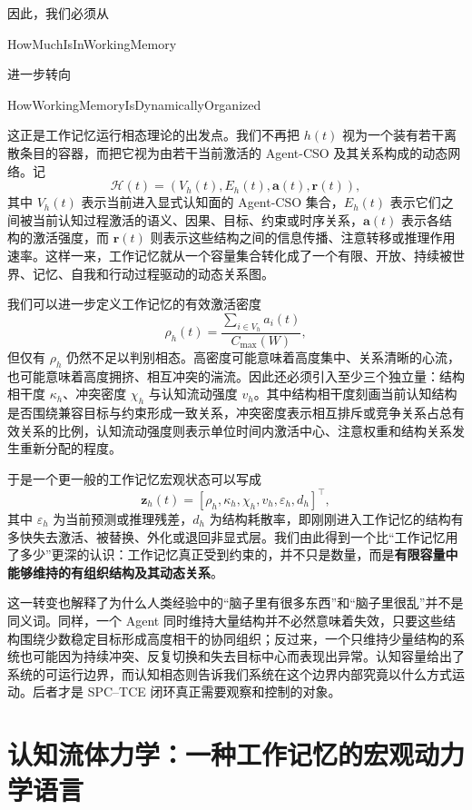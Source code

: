 因此，我们必须从
\begin{statementbox}
HowMuchIsInWorkingMemory
\end{statementbox}
进一步转向
\begin{statementbox}
HowWorkingMemoryIsDynamicallyOrganized
\end{statementbox}
这正是工作记忆运行相态理论的出发点。我们不再把 $h(t)$ 视为一个装有若干离散条目的容器，而把它视为由若干当前激活的 Agent-CSO 及其关系构成的动态网络。记
\[
\mathcal H(t)=
\left(
V_h(t),
E_h(t),
\mathbf a(t),
\mathbf r(t)
\right),
\]
其中 $V_h(t)$ 表示当前进入显式认知面的 Agent-CSO 集合，$E_h(t)$ 表示它们之间被当前认知过程激活的语义、因果、目标、约束或时序关系，$\mathbf a(t)$ 表示各结构的激活强度，而 $\mathbf r(t)$ 则表示这些结构之间的信息传播、注意转移或推理作用速率。这样一来，工作记忆就从一个容量集合转化成了一个有限、开放、持续被世界、记忆、自我和行动过程驱动的动态关系图。

我们可以进一步定义工作记忆的有效激活密度
\[
\rho_h(t)
=
\frac{
\sum_{i\in V_h}a_i(t)
}{
C_{\max}(W)
},
\]
但仅有 $\rho_h$ 仍然不足以判别相态。高密度可能意味着高度集中、关系清晰的心流，也可能意味着高度拥挤、相互冲突的湍流。因此还必须引入至少三个独立量：结构相干度 $\kappa_h$、冲突密度 $\chi_h$ 与认知流动强度 $v_h$。其中结构相干度刻画当前认知结构是否围绕兼容目标与约束形成一致关系，冲突密度表示相互排斥或竞争关系占总有效关系的比例，认知流动强度则表示单位时间内激活中心、注意权重和结构关系发生重新分配的程度。

于是一个更一般的工作记忆宏观状态可以写成
\[
\mathbf z_h(t)
=
\left[
\rho_h,
\kappa_h,
\chi_h,
v_h,
\varepsilon_h,
d_h
\right]^{\top},
\]
其中 $\varepsilon_h$ 为当前预测或推理残差，$d_h$ 为结构耗散率，即刚刚进入工作记忆的结构有多快失去激活、被替换、外化或退回非显式层。我们由此得到一个比“工作记忆用了多少”更深的认识：工作记忆真正受到约束的，并不只是数量，而是\textbf{有限容量中能够维持的有组织结构及其动态关系}。

这一转变也解释了为什么人类经验中的“脑子里有很多东西”和“脑子里很乱”并不是同义词。同样，一个 Agent 同时维持大量结构并不必然意味着失效，只要这些结构围绕少数稳定目标形成高度相干的协同组织；反过来，一个只维持少量结构的系统也可能因为持续冲突、反复切换和失去目标中心而表现出异常。认知容量给出了系统的可运行边界，而认知相态则告诉我们系统在这个边界内部究竟以什么方式运动。后者才是 SPC--TCE 闭环真正需要观察和控制的对象。

\section{认知流体力学：一种工作记忆的宏观动力学语言}

